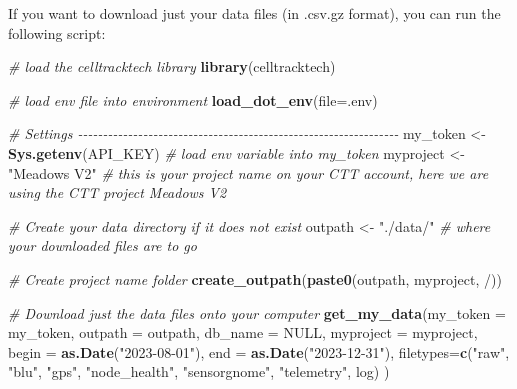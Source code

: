 \documentclass[
]{book}
\newenvironment{Shaded}{\begin{snugshade}}{\end{snugshade}}
\newcommand{\AttributeTok}[1]{\textcolor[rgb]{0.13,0.29,0.53}{#1}}
\newcommand{\CommentTok}[1]{\textcolor[rgb]{0.56,0.35,0.01}{\textit{#1}}}
\newcommand{\ConstantTok}[1]{\textcolor[rgb]{0.56,0.35,0.01}{#1}}
\newcommand{\FunctionTok}[1]{\textcolor[rgb]{0.13,0.29,0.53}{\textbf{#1}}}
\newcommand{\NormalTok}[1]{#1}
\newcommand{\OtherTok}[1]{\textcolor[rgb]{0.56,0.35,0.01}{#1}}
\newcommand{\StringTok}[1]{\textcolor[rgb]{0.31,0.60,0.02}{#1}}
\begin{document}
If you want to download just your data files (in .csv.gz format), you can run the following script:

\begin{Shaded}
\begin{Highlighting}[]
\CommentTok{\# load the celltracktech library}
\FunctionTok{library}\NormalTok{(celltracktech)}

\CommentTok{\# load env file into environment}
\FunctionTok{load\_dot\_env}\NormalTok{(}\AttributeTok{file=}\StringTok{\textquotesingle{}.env\textquotesingle{}}\NormalTok{)}

\CommentTok{\# Settings {-}{-}{-}{-}{-}{-}{-}{-}{-}{-}{-}{-}{-}{-}{-}{-}{-}{-}{-}{-}{-}{-}{-}{-}{-}{-}{-}{-}{-}{-}{-}{-}{-}{-}{-}{-}{-}{-}{-}{-}{-}{-}{-}{-}{-}{-}{-}{-}{-}{-}{-}{-}{-}{-}{-}{-}{-}{-}{-}{-}{-}{-}{-}{-}}
\NormalTok{my\_token }\OtherTok{\textless{}{-}} \FunctionTok{Sys.getenv}\NormalTok{(}\StringTok{\textquotesingle{}API\_KEY\textquotesingle{}}\NormalTok{) }\CommentTok{\# load env variable into my\_token}
\NormalTok{myproject }\OtherTok{\textless{}{-}} \StringTok{"Meadows V2"} \CommentTok{\# this is your project name on your CTT account, here we are using the CTT project \textquotesingle{}Meadows V2\textquotesingle{}}

\CommentTok{\# Create your data directory if it does not exist}
\NormalTok{outpath }\OtherTok{\textless{}{-}} \StringTok{"./data/"} \CommentTok{\# where your downloaded files are to go}

\CommentTok{\# Create project name folder}
\FunctionTok{create\_outpath}\NormalTok{(}\FunctionTok{paste0}\NormalTok{(outpath, myproject, }\StringTok{\textquotesingle{}/\textquotesingle{}}\NormalTok{))}

\CommentTok{\# Download just the data files onto your computer}
\FunctionTok{get\_my\_data}\NormalTok{(}\AttributeTok{my\_token =}\NormalTok{ my\_token,}
            \AttributeTok{outpath =}\NormalTok{ outpath, }
            \AttributeTok{db\_name =} \ConstantTok{NULL}\NormalTok{,}
            \AttributeTok{myproject =}\NormalTok{ myproject,}
            \AttributeTok{begin =} \FunctionTok{as.Date}\NormalTok{(}\StringTok{"2023{-}08{-}01"}\NormalTok{),}
            \AttributeTok{end =} \FunctionTok{as.Date}\NormalTok{(}\StringTok{"2023{-}12{-}31"}\NormalTok{),}
            \AttributeTok{filetypes=}\FunctionTok{c}\NormalTok{(}\StringTok{"raw"}\NormalTok{, }\StringTok{"blu"}\NormalTok{, }\StringTok{"gps"}\NormalTok{, }\StringTok{"node\_health"}\NormalTok{, }\StringTok{"sensorgnome"}\NormalTok{, }\StringTok{"telemetry"}\NormalTok{, }\StringTok{\textquotesingle{}log\textquotesingle{}}\NormalTok{)}
\NormalTok{)}
\end{Highlighting}
\end{Shaded}
\end{document}
